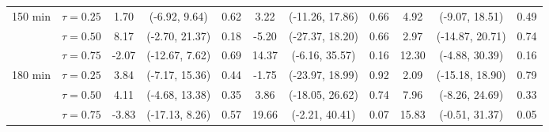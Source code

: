 \begin{table}[ht]
{\begin{tabular}{llccccccccc}
\midrule
\multirow{3}{*}{150 min} & $\tau=0.25$ & 1.70 & (-6.92, 9.64) & 0.62 & 3.22 & (-11.26, 17.86) & 0.66 & 4.92 & (-9.07, 18.51) & 0.49 \\
 & $\tau=0.50$ & 8.17 & (-2.70, 21.37) & 0.18 & -5.20 & (-27.37, 18.20) & 0.66 & 2.97 & (-14.87, 20.71) & 0.74 \\
 & $\tau=0.75$ & -2.07 & (-12.67, 7.62) & 0.69 & 14.37 & (-6.16, 35.57) & 0.16 & 12.30 & (-4.88, 30.39) & 0.16 \\
\midrule
\multirow{3}{*}{180 min} & $\tau=0.25$ & 3.84 & (-7.17, 15.36) & 0.44 & -1.75 & (-23.97, 18.99) & 0.92 & 2.09 & (-15.18, 18.90) & 0.79 \\
 & $\tau=0.50$ & 4.11 & (-4.68, 13.38) & 0.35 & 3.86 & (-18.05, 26.62) & 0.74 & 7.96 & (-8.26, 24.69) & 0.33 \\
 & $\tau=0.75$ & -3.83 & (-17.13, 8.26) & 0.57 & 19.66 & (-2.21, 40.41) & 0.07 & 15.83 & (-0.51, 31.37) & 0.05 \\
\bottomrule
\end{tabular}%
}
\end{table}
